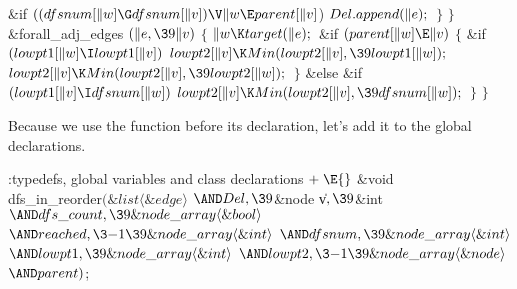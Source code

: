 \&{if} ${}((\\{dfsnum}[\|w]\G\\{dfsnum}[\|v])\V\|w\E\\{parent}[\|v]{}$)\1\6
${}\\{Del}.\\{append}(\|e);{}$\2\6
\4${}\}{}$\2\6
\4${}\}{}$\2\6
\&{forall\_adj\_edges} ${}(\|e,\39\|v){}$\5
${}\{{}$\1\6
${}\|w\K\\{target}(\|e);{}$\6
\&{if} ${}(\\{parent}[\|w]\E\|v){}$\5
${}\{{}$\1\6
\&{if} ${}(\\{lowpt1}[\|w]\I\\{lowpt1}[\|v]){}$\1\5
${}\\{lowpt2}[\|v]\K\\{Min}(\\{lowpt2}[\|v],\39\\{lowpt1}[\|w]);{}$\2\6
${}\\{lowpt2}[\|v]\K\\{Min}(\\{lowpt2}[\|v],\39\\{lowpt2}[\|w]);{}$\6
\4${}\}{}$\2\6
\&{else}\6
\&{if} ${}(\\{lowpt1}[\|v]\I\\{dfsnum}[\|w]){}$\1\5
${}\\{lowpt2}[\|v]\K\\{Min}(\\{lowpt2}[\|v],\39\\{dfsnum}[\|w]);{}$\2\6
\4${}\}{}$\2\6
\4${}\}{}$\2\par
\fi

Because we use the function  before its
declaration,
let's add it to the global declarations.

\Y\B\4:typedefs, global variables and class declarations\X${}\mathrel+\E{}$%
\6
\&{void} \\{dfs\_in\_reorder}${}(\&{list}\langle\&{edge}\rangle{}$ ${}{\AND}%
\\{Del},\39{}$\&{node} \|v${},\39{}$\&{int} ${}{\AND}\\{dfs\_count},\39\&{node%
\_array}\langle\&{bool}\rangle{}$ ${}{\AND}\\{reached},\3{-1}\39\&{node\_array}%
\langle\&{int}\rangle{}$ ${}{\AND}\\{dfsnum},\39\&{node\_array}\langle\&{int}%
\rangle{}$ ${}{\AND}\\{lowpt1},\39\&{node\_array}\langle\&{int}\rangle{}$ ${}{%
\AND}\\{lowpt2},\3{-1}\39\&{node\_array}\langle\&{node}\rangle{}$ ${}{\AND}%
\\{parent}){}$;\par
\fi


